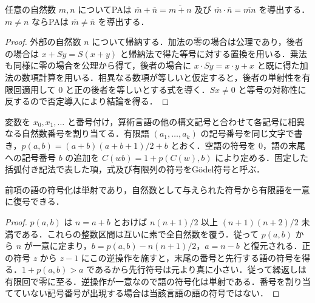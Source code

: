 \begin{prop}[数項の演算]
任意の自然数 $m,n$ についてPAは $\overline m+\overline n=\overline{m+n}$ 及び $\overline m\cdot\overline n=\overline{mn}$ を導出する．$m\ne n$ ならPAは $\overline m\ne\overline n$ を導出する．
\end{prop}
\begin{proof}
外部の自然数 $n$ について帰納する．加法の零の場合は公理であり，後者の場合は $x+Sy=S(x+y)$ と帰納法で得た等号に対する置換を用いる．乗法も同様に零の場合を公理から得て，後者の場合に $x\cdot Sy=x\cdot y+x$ と既に得た加法の数項計算を用いる．相異なる数項が等しいと仮定すると，後者の単射性を有限回適用して $0$ と正の後者を等しいとする式を導く．$Sx\ne0$ と等号の対称性に反するので否定導入により結論を得る．
\end{proof}
\begin{defn}[算術式のGödel符号]
変数を $x_0,x_1,\ldots$ と番号付け，算術言語の他の構文記号と合わせて各記号に相異なる自然数番号を割り当てる．有限語 $(a_1,\ldots,a_k)$ の記号番号を同じ文字で書き，$p(a,b)=(a+b)(a+b+1)/2+b$ とおく．空語の符号を $0$，語の末尾への記号番号 $b$ の追加を $C(wb)=1+p(C(w),b)$ により定める．固定した括弧付き記法で表した項，式及び有限列の符号をGödel符号と呼ぶ．
\end{defn}
\begin{prop}[Gödel符号の単射性と復号]
前項の語の符号化は単射であり，自然数として与えられた符号から有限語を一意に復号できる．
\end{prop}
\begin{proof}
$p(a,b)$ は $n=a+b$ とおけば $n(n+1)/2$ 以上 $(n+1)(n+2)/2$ 未満である．これらの整数区間は互いに素で全自然数を覆う．従って $p(a,b)$ から $n$ が一意に定まり，$b=p(a,b)-n(n+1)/2$，$a=n-b$ と復元される．正の符号 $z$ から $z-1$ にこの逆操作を施すと，末尾の番号と先行する語の符号を得る．$1+p(a,b)>a$ であるから先行符号は元より真に小さい．従って繰返しは有限回で零に至る．逆操作が一意なので語の符号化は単射である．番号を割り当てていない記号番号が出現する場合は当該言語の語の符号ではない．
\end{proof}
